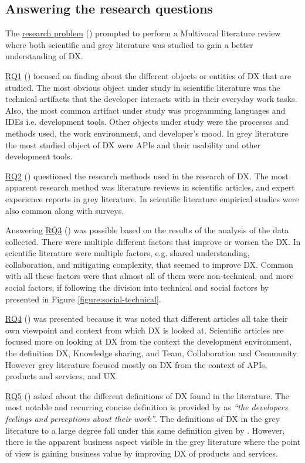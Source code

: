 \documentclass[english, 12pt, a4paper, sci, utf8, a-1b, online]{aaltothesis}
\begin{document}
\subsection{Answering the research questions}

The \hyperref[research-problem]{research problem} (\researchproblem) prompted to perform a Multivocal literature review where both scientific and grey literature was studied to gain a better understanding of DX.

\hyperref[RQ1]{RQ1} (\rqone) focused on finding about the different objects or entities of DX that are studied. The most obvious object under study in scientific literature was the technical artifacts that the developer interacts with in their everyday work tasks. Also, the most common artifact under study was programming languages and IDEs i.e. development tools. Other objects under study were the processes and methods used, the work environment, and developer's mood. In grey literature the most studied object of DX were APIs and their usability and other development tools.

\hyperref[RQ2]{RQ2} (\rqtwo) questioned the research methods used in the research of DX. The most apparent research method was literature reviews in scientific articles, and expert experience reports in grey literature. In scientific literature empirical studies were also common along with surveys.

Answering \hyperref[RQ3]{RQ3} (\rqthree) was possible based on the results of the analysis of the data collected. There were multiple different factors that improve or worsen the DX. In scientific literature were multiple factors, e.g. shared understanding, collaboration, and mitigating complexity, that seemed to improve DX. Common with all these factors were that almost all of them were non-technical, and more social factors, if following the division into technical and social factors by \textcite{fagerholm-doctoral-thesis} presented in Figure \ref{figure:social-technical}.

\hyperref[RQ4]{RQ4} (\rqfour) was presented because it was noted that different articles all take their own viewpoint and context from which DX is looked at. Scientific articles are focused more on looking at DX from the context the development environment, the definition DX, Knowledge sharing, and Team, Collaboration and Community. However grey literature focused mostly on DX from the context of APIs, products and services, and UX.

\hyperref[RQ5]{RQ5} (\rqfive) asked about the different definitions of DX found in the literature. The most notable and recurring concise definition is provided by \textcite{fagerholm-dx-concept-and-definition} as \textit{``the developers feelings and perceptions about their work''}. The definitions of DX in the grey literature to a large degree fall under this same definition given by \textcite{fagerholm-dx-concept-and-definition}. However, there is the apparent business aspect visible in the grey literature where the point of view is gaining business value by improving DX of products and services.
\end{document}
